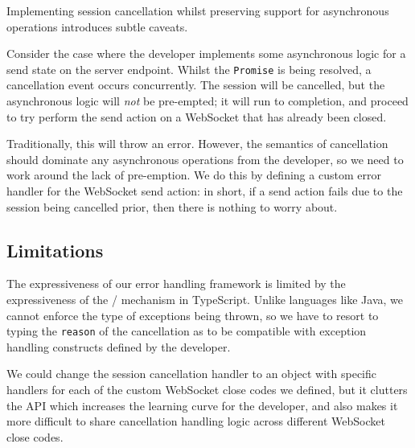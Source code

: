 Implementing session cancellation whilst
preserving support for asynchronous operations introduces
subtle caveats. 

Consider the case where the developer implements
some asynchronous logic for a send state on the server endpoint. 
Whilst the \texttt{Promise} is being resolved, a cancellation
event occurs concurrently. The session will be cancelled, but
the asynchronous logic will \textit{not} be pre-empted; it
will run to completion, and proceed to try perform the send
action on a WebSocket that has already been closed.

Traditionally, this will throw an error. However,
the semantics of cancellation should dominate any asynchronous
operations from the developer, so we need to work around
the lack of pre-emption. We do this by defining a custom
error handler for the WebSocket send action: in short,
if a send action fails due to the session
being cancelled prior, then there is nothing to worry about.

\subsection{Limitations}
\label{subsection:errorlimit}

The expressiveness of our error handling framework is
limited by the expressiveness of the 
 /  mechanism
in TypeScript.
Unlike languages like Java, we cannot enforce the type
of exceptions being thrown, so we have to resort to
typing the \texttt{reason} of the cancellation as 
 to be compatible with 
exception handling constructs defined by the developer.

We could change the session cancellation handler
to an object with specific handlers for each of the
custom WebSocket close codes we defined, but it
clutters the API which increases the learning
curve for the developer, and also makes it
more difficult to share cancellation handling logic
across different WebSocket close codes.
